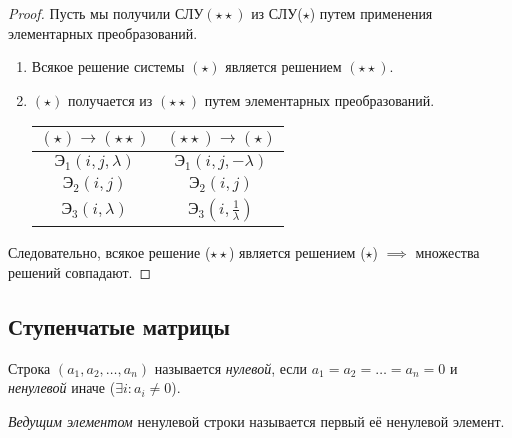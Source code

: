 \begin{proof}
    Пусть мы получили СЛУ$(\star\star)$ из СЛУ($\star$) путем применения элементарных преобразований.

    \begin{enumerate}[nosep]
    \item
        Всякое решение системы $(\star)$ является решением $(\star\star)$.
    \item
        $(\star)$ получается из $(\star\star)$ путем элементарных преобразований.

        \begin{tabular}{c|c|}
            $(\star) \to (\star\star)$ & $(\star\star) \to (\star)$ \\
            \hline
            $\text{Э}_1(i, j, \lambda)$ & $\text{Э}_1(i, j, -\lambda)$ \\
            $\text{Э}_2(i, j)$ & $\text{Э}_2(i, j)$ \\
            $\text{Э}_3(i, \lambda)$ & $\text{Э}_3(i, \frac{1}{\lambda})$
        \end{tabular}
    \end{enumerate} 

    Следовательно, всякое решение ($\star\star$) является решением ($\star$) $\implies$ множества решений совпадают.
\end{proof}


\subsection{Ступенчатые матрицы}

\begin{definition}
    Строка $(a_1, a_2, \dots, a_n)$ называется \textit{нулевой}, если $a_1 = a_2 = \dots = a_n = 0$ и \textit{ненулевой} иначе ($\exists i : a_i \neq 0$).
\end{definition}

\begin{definition}
    \textit{Ведущим элементом} ненулевой строки называется первый её ненулевой элемент.
\end{definition}

